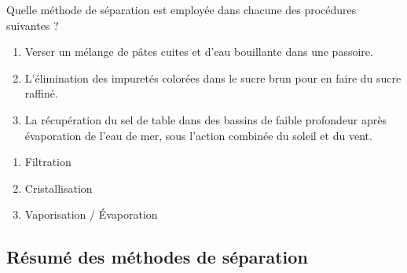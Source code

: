 \documentclass[
  11pt,
  a4paper,
  openany]{book}
\providecommand{\tightlist}{%
  \setlength{\itemsep}{0pt}\setlength{\parskip}{0pt}}
\begin{document}
\begin{Exercise}

Quelle méthode de séparation est employée dans chacune des procédures suivantes ?

\begin{enumerate}
\def\labelenumi{\arabic{enumi}.}
\tightlist
\item
  Verser un mélange de pâtes cuites et d'eau bouillante dans une passoire.
\item
  L'élimination des impuretés colorées dans le sucre brun pour en faire du sucre raffiné.
\item
  La récupération du sel de table dans des bassins de faible profondeur après évaporation de l'eau de mer, sous l'action combinée du soleil et du vent.
\end{enumerate}

\end{Exercise}

\begin{Answer}

\begin{enumerate}
\def\labelenumi{\arabic{enumi}.}
\tightlist
\item
  Filtration
\item
  Cristallisation
\item
  Vaporisation / Évaporation
\end{enumerate}

\end{Answer}

\subsection{Résumé des méthodes de séparation}\label{ruxe9sumuxe9-des-muxe9thodes-de-suxe9paration}
\end{document}

